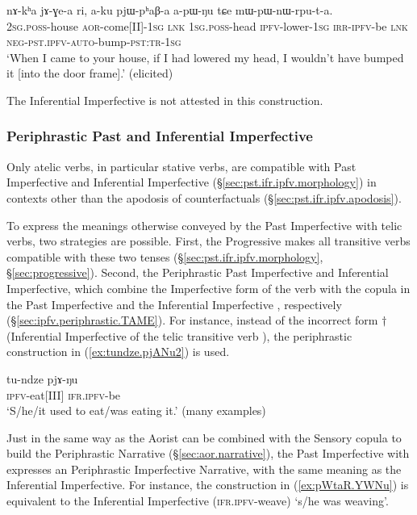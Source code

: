 \begin{exe}
\ex \label{ex:apWNu.mWpWnWrputa}
\gll nɤ-kʰa jɤ-ɣe-a ri, a-ku pjɯ-pʰaβ-a a-pɯ-ŋu tɕe mɯ-pɯ-nɯ-rpu-t-a. \\
\textsc{2sg}.\textsc{poss}-house \textsc{aor}-come[II]-\textsc{1sg} \textsc{lnk} \textsc{1sg}.\textsc{poss}-head \textsc{ipfv}-lower-\textsc{1sg} \textsc{irr}-\textsc{ipfv}-be \textsc{lnk} \textsc{neg}-\textsc{pst}.\textsc{ipfv}-\textsc{auto}-bump-\textsc{pst}:\textsc{tr}-\textsc{1sg} \\
\glt `When I came to your house, if I had lowered my head, I wouldn't have bumped it [into the door frame].' (elicited)
\end{exe}

The Inferential Imperfective is not attested in this construction.

\subsubsection{Periphrastic Past and Inferential Imperfective} \label{sec:pst.ifr.ipfv.periphrastic}
Only atelic verbs, in particular stative verbs, are compatible with Past Imperfective and Inferential Imperfective (§\ref{sec:pst.ifr.ipfv.morphology}) in contexts other than the apodosis of counterfactuals (§\ref{sec:pst.ifr.ipfv.apodosis}).

To express the meanings otherwise conveyed by the Past Imperfective with telic verbs, two strategies are possible. First, the Progressive  makes all transitive verbs compatible with these two tenses (§\ref{sec:pst.ifr.ipfv.morphology}, §\ref{sec:progressive}). Second, the Periphrastic Past Imperfective and Inferential Imperfective, which combine the Imperfective form of the verb with the copula in the Past Imperfective  and the Inferential Imperfective , respectively (§\ref{sec:ipfv.periphrastic.TAME}). For instance, instead of the incorrect form $\dagger$ (Inferential Imperfective of the telic transitive verb ), the periphrastic construction in (\ref{ex:tundze.pjANu2}) is used.


\begin{exe}
\ex \label{ex:tundze.pjANu2}
\gll  tu-ndze pjɤ-ŋu \\
\textsc{ipfv}-eat[III] \textsc{ifr}.\textsc{ipfv}-be \\
\glt `S/he/it used to eat/was eating it.' (many examples)
\end{exe}


Just in the same way as the Aorist can be combined with the Sensory copula  to build the Periphrastic Narrative (§\ref{sec:aor.narrative}), the Past Imperfective with  expresses an Periphrastic Imperfective Narrative, with the same meaning as the Inferential Imperfective. For instance, the construction in (\ref{ex:pWtaR.YWNu}) is equivalent to the Inferential Imperfective  (\textsc{ifr}.\textsc{ipfv}-weave) `s/he was weaving'.

